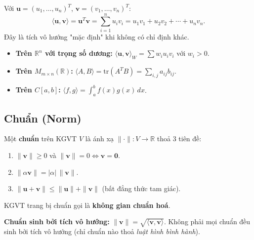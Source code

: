 \documentclass[12pt,a4paper]{article}
\begin{document}
\begin{congthuc}[title={Tích vô hướng chuẩn trên $\mathbb{R}^n$}]
Với $\mathbf{u} = (u_1, \ldots, u_n)^T$, $\mathbf{v} = (v_1, \ldots, v_n)^T$:
\[
  \langle \mathbf{u}, \mathbf{v}\rangle = \mathbf{u}^T \mathbf{v} = \sum_{i=1}^n u_i v_i = u_1 v_1 + u_2 v_2 + \cdots + u_n v_n.
\]
Đây là tích vô hướng "mặc định" khi không có chỉ định khác.
\end{congthuc}

\begin{vidu}[title={Một số tích vô hướng khác}]
\begin{itemize}
  \item \textbf{Trên $\mathbb{R}^n$ với trọng số dương:} $\langle \mathbf{u}, \mathbf{v}\rangle_W = \sum w_i u_i v_i$ với $w_i > 0$.
  \item \textbf{Trên $M_{m\times n}(\mathbb{R})$:} $\langle A, B\rangle = \mathrm{tr}(A^T B) = \sum_{i,j} a_{ij} b_{ij}$.
  \item \textbf{Trên $C[a, b]$:} $\langle f, g\rangle = \int_a^b f(x) g(x)\, dx$.
\end{itemize}
\end{vidu}

\subsection{Chuẩn (Norm)}

\begin{dinhnghia}
  Một \textbf{chuẩn} trên KGVT $V$ là ánh xạ $\|\cdot\|: V \to \mathbb{R}$ thoả 3 tiên đề:
  \begin{enumerate}
    \item $\|\mathbf{v}\| \ge 0$ và $\|\mathbf{v}\| = 0 \Leftrightarrow \mathbf{v} = \mathbf{0}$.
    \item $\|\alpha \mathbf{v}\| = |\alpha|\,\|\mathbf{v}\|$.
    \item $\|\mathbf{u} + \mathbf{v}\| \le \|\mathbf{u}\| + \|\mathbf{v}\|$ (bất đẳng thức tam giác).
  \end{enumerate}
  KGVT trang bị chuẩn gọi là \textbf{không gian chuẩn hoá}.

  \textbf{Chuẩn sinh bởi tích vô hướng:} $\|\mathbf{v}\| = \sqrt{\langle \mathbf{v}, \mathbf{v}\rangle}$. Không phải mọi chuẩn đều sinh bởi tích vô hướng (chỉ chuẩn nào thoả \emph{luật hình bình hành}).
\end{dinhnghia}
\end{document}
